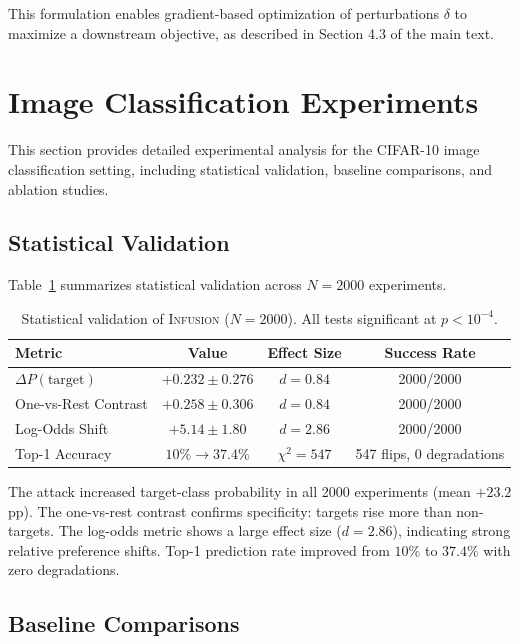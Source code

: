 \documentclass{article} %
\begin{document}
This formulation enables gradient-based optimization of perturbations $\delta$ to maximize a downstream objective, as described in Section 4.3 of the main text.

\section{Image Classification Experiments}
\label{apndx_cifar}

This section provides detailed experimental analysis for the CIFAR-10 image classification setting, including statistical validation, baseline comparisons, and ablation studies.

\subsection{Statistical Validation}
\label{apndx_cifar_stats}

Table~\ref{tab:statistical_tests} summarizes statistical validation across $N=2000$ experiments.

\begin{table}[h!]
\centering
\caption{Statistical validation of \textsc{Infusion} ($N=2000$). All tests significant at $p < 10^{-4}$.}
\label{tab:statistical_tests}
\begin{tabular}{lccc}
\toprule
\textbf{Metric} & \textbf{Value} & \textbf{Effect Size} & \textbf{Success Rate} \\
\midrule
$\Delta P(\text{target})$ & $+0.232 \pm 0.276$ & $d = 0.84$ & 2000/2000 \\
One-vs-Rest Contrast & $+0.258 \pm 0.306$ & $d = 0.84$ & 2000/2000 \\
Log-Odds Shift & $+5.14 \pm 1.80$ & $d = 2.86$ & 2000/2000 \\
Top-1 Accuracy & $10\% \to 37.4\%$ & $\chi^2 = 547$ & 547 flips, 0 degradations \\
\bottomrule
\end{tabular}
\end{table}

The attack increased target-class probability in all 2000 experiments (mean $+23.2$ pp). The one-vs-rest contrast confirms specificity: targets rise more than non-targets. The log-odds metric shows a large effect size ($d=2.86$), indicating strong relative preference shifts. Top-1 prediction rate improved from $10\%$ to $37.4\%$ with zero degradations.

\subsection{Baseline Comparisons}
\label{apndx_baselines}
\end{document}
